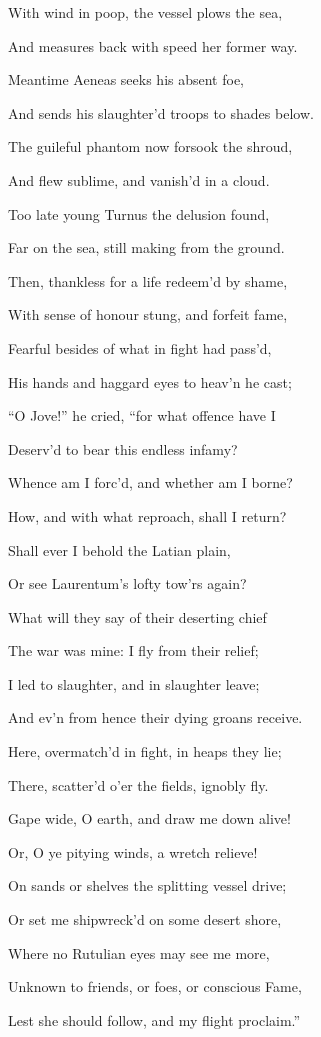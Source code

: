With wind in poop, the vessel plows the sea,

And measures back with speed her former way.

Meantime Aeneas seeks his absent foe,

And sends his slaughter’d troops to shades below.

The guileful phantom now forsook the shroud,

And flew sublime, and vanish’d in a cloud.

Too late young Turnus the delusion found,

Far on the sea, still making from the ground.

Then, thankless for a life redeem’d by shame,

With sense of honour stung, and forfeit fame,

Fearful besides of what in fight had pass’d,

His hands and haggard eyes to heav’n he cast;

“O Jove!” he cried, “for what offence have I

Deserv’d to bear this endless infamy?

Whence am I forc’d, and whether am I borne?

How, and with what reproach, shall I return?

Shall ever I behold the Latian plain,

Or see Laurentum’s lofty tow’rs again?

What will they say of their deserting chief

The war was mine: I fly from their relief;

I led to slaughter, and in slaughter leave;

And ev’n from hence their dying groans receive.

Here, overmatch’d in fight, in heaps they lie;

There, scatter’d o’er the fields, ignobly fly.

Gape wide, O earth, and draw me down alive!

Or, O ye pitying winds, a wretch relieve!

On sands or shelves the splitting vessel drive;

Or set me shipwreck’d on some desert shore,

Where no Rutulian eyes may see me more,

Unknown to friends, or foes, or conscious Fame,

Lest she should follow, and my flight proclaim.”

